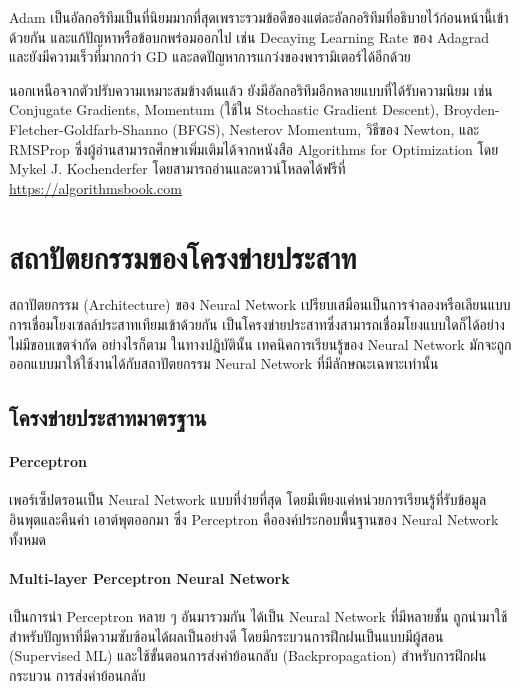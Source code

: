 Adam เป็นอัลกอริทึมเป็นที่นิยมมากที่สุดเพราะรวมข้อดีของแต่ละอัลกอริทึมที่อธิบายไว้ก่อนหน้านี้เข้าด้วยกัน และแก้ปัญหาหรือข้อบกพร่อมออกไป
เช่น Decaying Learning Rate ของ Adagrad และยังมีความเร็วที่มากกว่า GD และลดปัญหาการแกว่งของพารามิเตอร์ได้อีกด้วย

นอกเหนือจากตัวปรับความเหมาะสมข้างต้นแล้ว ยังมีอัลกอริทึมอีกหลายแบบที่ได้รับความนิยม เช่น Conjugate Gradients, Momentum (ใช้ใน
Stochastic Gradient Descent), Broyden-Fletcher-Goldfarb-Shanno (BFGS), Nesterov Momentum, วิธีของ Newton, และ
RMSProp ซึ่งผู้อ่านสามารถศึกษาเพิ่มเติมได้จากหนังสือ Algorithms for Optimization\autocite{kochenderfer2019} โดย Mykel J.
Kochenderfer โดยสามารถอ่านและดาวน์โหลดได้ฟรีที่ \url{https://algorithmsbook.com}

\section{สถาปัตยกรรมของโครงข่ายประสาท}
\label{sec:arch_nn}

สถาปัตยกรรม (Architecture) ของ Neural Network เปรียบเสมือนเป็นการจำลองหรือเลียนแบบการเชื่อมโยงเซลล์ประสาทเทียมเข้าด้วยกัน%
เป็นโครงข่ายประสาทซึ่งสามารถเชื่อมโยงแบบใดก็ได้อย่างไม่มีขอบเขตจำกัด อย่างไรก็ตาม ในทางปฏิบัตินั้น เทคนิคการเรียนรู้ของ Neural Network
มักจะถูกออกแบบมาให้ใช้งานได้กับสถาปัตยกรรม Neural Network ที่มีลักษณะเฉพาะเท่านั้น

\subsection{โครงข่ายประสาทมาตรฐาน}
\label{ssec:std_nn}

\paragraph{Perceptron} เพอร์เซ็ปตรอนเป็น Neural Network แบบที่ง่ายที่สุด โดยมีเพียงแค่หน่วยการเรียนรู้ที่รับข้อมูลอินพุตและคืนค่า%
เอาต์พุตออกมา ซึ่ง Perceptron คือองค์ประกอบพื้นฐานของ Neural Network ทั้งหมด

\paragraph{Multi-layer Perceptron Neural Network}
เป็นการนำ Perceptron หลาย ๆ อันมารวมกัน ได้เป็น Neural Network ที่มีหลายชั้น ถูกนำมาใช้สำหรับปัญหาที่มีความซับซ้อนได้ผลเป็นอย่างดี
โดยมีกระบวนการฝึกฝนเป็นแบบมีผู้สอน (Supervised ML) และใช้ขั้นตอนการส่งค่าย้อนกลับ (Backpropagation) สำหรับการฝึกฝนกระบวน%
การส่งค่าย้อนกลับ

